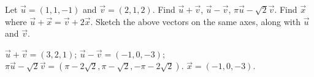 
\begin{Exercise}[
name={},
title={}, 
difficulty=0,
origin={\cite{GHC}}]
Let $\vec u = (1,1,-1)$ and $\vec v= (2,1,2)$. 
\Question Find $\vec u+\vec v$, $\vec u-\vec v$, $\pi\vec u-\sqrt{2}\vec v$.
\Question Find $\vec x$ where $\vec u+\vec x = \vec v+2\vec x$.
\Question Sketch the above vectors on the same axes, along with $\vec u$ and $\vec v$.

\end{Exercise}
\begin{Answer}
\Question $\vec u+\vec v = (3,2,1)$; $\vec u -\vec v = (-1,0,-3)$; $\pi\vec u-\sqrt{2}\vec v = (\pi-2\sqrt{2},\pi-\sqrt{2},-\pi-2\sqrt{2})$.
\Question $\vec x = (-1,0,-3)$.
\end{Answer}
